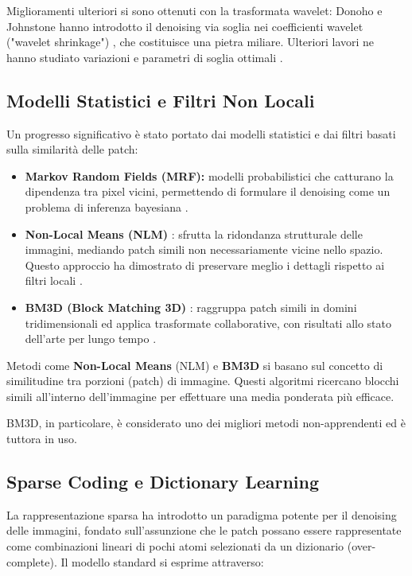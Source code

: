 \documentclass[12pt,a4paper,openright,twoside]{book}
\begin{document}
Miglioramenti ulteriori si sono ottenuti con la trasformata wavelet: Donoho e Johnstone hanno introdotto il denoising via soglia nei coefficienti wavelet ("wavelet shrinkage") \parencite{donoho1995}, che costituisce una pietra miliare. Ulteriori lavori ne hanno studiato variazioni e parametri di soglia ottimali \parencite{springer2003, eurasip2020}.
\newpage
\subsection*{Modelli Statistici e Filtri Non Locali}
Un progresso significativo è stato portato dai modelli statistici e dai filtri basati sulla similarità delle patch:
\begin{itemize}
    \item \textbf{Markov Random Fields (MRF):} modelli probabilistici che catturano la dipendenza tra pixel vicini, permettendo di formulare il denoising come un problema di inferenza bayesiana \parencite{geman1984stochastic}.
    \item \textbf{Non-Local Means (NLM)} \parencite{buades2005nonlocal}: sfrutta la ridondanza strutturale delle immagini, mediando patch simili non necessariamente vicine nello spazio. Questo approccio ha dimostrato di preservare meglio i dettagli rispetto ai filtri locali \parencite{buades2005nlmeans}.
    \item \textbf{BM3D (Block Matching 3D)} \parencite{dabov2007bm3d}: raggruppa patch simili in domini tridimensionali ed applica trasformate collaborative, con risultati allo stato dell'arte per lungo tempo \parencite{wang2020_review}.
\end{itemize}
Metodi come \textbf{Non-Local Means} (NLM) e \textbf{BM3D} si basano sul concetto di similitudine tra porzioni (patch) di immagine. Questi algoritmi ricercano blocchi simili all'interno dell'immagine per effettuare una media ponderata più efficace. 

BM3D, in particolare, è considerato uno dei migliori metodi non-apprendenti ed è tuttora in uso.

\subsection*{Sparse Coding e Dictionary Learning}
La rappresentazione sparsa ha introdotto un paradigma potente per il denoising delle immagini, fondato sull'assunzione che le patch possano essere rappresentate come combinazioni lineari di pochi atomi selezionati da un dizionario (over-complete). Il modello standard si esprime attraverso:
\end{document}
